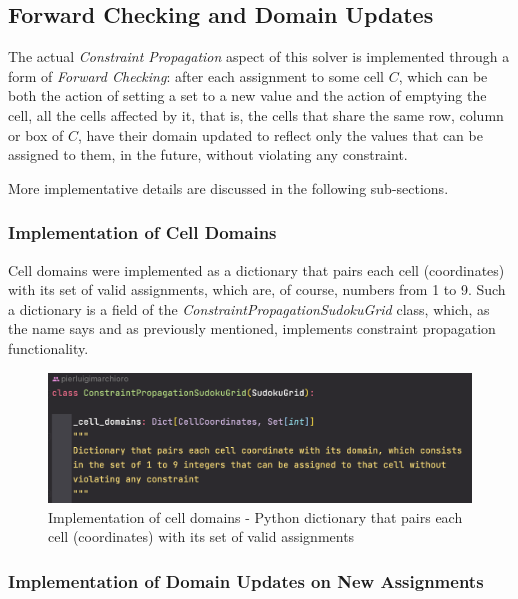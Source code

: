 \subsection{Forward Checking and Domain Updates}

The actual \textit{Constraint Propagation} aspect of this solver is implemented through a form of \textit{Forward Checking}: after each assignment to some cell $C$, which can be both the action of setting a set to a new value and the action of emptying the cell, all the cells affected by it, that is, the cells that share the same row, column or box of $C$, have their domain updated to reflect only the values that can be assigned to them, in the future, without violating any constraint.
\par
More implementative details are discussed in the following sub-sections.

\subsubsection{Implementation of Cell Domains}

Cell domains were implemented as a dictionary that pairs each cell (coordinates) with its set of valid assignments, which are, of course, numbers from 1 to 9. Such a dictionary is a field of the \textit{ConstraintPropagationSudokuGrid} class, which, as the name says and as previously mentioned, implements constraint propagation functionality.

\begin{figure}[h]
    \centering
    \includegraphics[scale=0.65]{assignment-1/images/cp/domains-1.png}
    \caption{Implementation of cell domains - Python dictionary that pairs each cell (coordinates) with its set of valid assignments}
    \label{fig:domain_1}
\end{figure}

\subsubsection{Implementation of Domain Updates on New Assignments}

